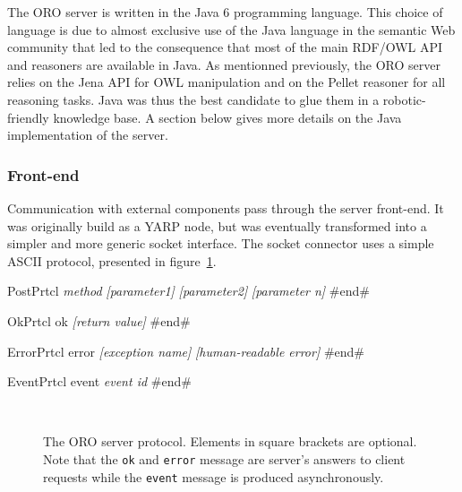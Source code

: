 The ORO server is written in the Java 6 programming language. This choice of
language is due to almost exclusive use of the Java language in the semantic
Web community that led to the consequence that most of the main RDF/OWL API and
reasoners are available in Java. As mentionned previously, the ORO server
relies on the Jena API for OWL manipulation and on the Pellet reasoner for all
reasoning tasks. Java was thus the best candidate to glue them in a
robotic-friendly knowledge base. A section below gives more details on the Java
implementation of the server.

\subsubsection{Front-end}

Communication with external components pass through the server front-end.  It
was originally build as a YARP node, but was eventually transformed into a
simpler and more generic socket interface.  The socket connector uses a simple
ASCII protocol, presented in figure~\ref{fig|oro-protocol}.

\begin{SaveVerbatim}[frame=single, commandchars=\\\{\}]{PostPrtcl}
\emph{method}
\emph{[parameter1]}
\emph{[parameter2]}
\emph{[parameter n]}
#end#
\end{SaveVerbatim}

\begin{SaveVerbatim}[frame=single, commandchars=\\\{\}]{OkPrtcl}
ok
\emph{[return value]}
#end#
\end{SaveVerbatim}

\begin{SaveVerbatim}[frame=single, commandchars=\\\{\}]{ErrorPrtcl}
error
\emph{[exception name]}
\emph{[human-readable error]}
#end#
\end{SaveVerbatim}

\begin{SaveVerbatim}[frame=single, commandchars=\\\{\}]{EventPrtcl}
event
\emph{event id}
#end#
\end{SaveVerbatim}

\begin{figure}
\centering

 \\

\caption{The ORO server protocol. Elements in square brackets are optional.
Note that the {\tt ok} and {\tt error} message are server's answers to client
requests while the {\tt event} message is produced asynchronously.}

\label{fig|oro-protocol}

\end{figure}

